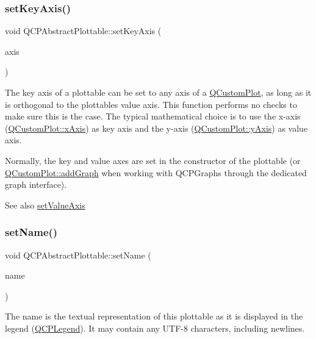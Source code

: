 \subsubsection{\texorpdfstring{set\+Key\+Axis()}{setKeyAxis()}}
{\footnotesize\ttfamily void Q\+C\+P\+Abstract\+Plottable\+::set\+Key\+Axis (\begin{DoxyParamCaption}\item[{\hyperlink{class_q_c_p_axis}{Q\+C\+P\+Axis} $\ast$}]{axis }\end{DoxyParamCaption})}

The key axis of a plottable can be set to any axis of a \hyperlink{class_q_custom_plot}{Q\+Custom\+Plot}, as long as it is orthogonal to the plottable\textquotesingle{}s value axis. This function performs no checks to make sure this is the case. The typical mathematical choice is to use the x-\/axis (\hyperlink{class_q_custom_plot_a9a79cd0158a4c7f30cbc702f0fd800e4}{Q\+Custom\+Plot\+::x\+Axis}) as key axis and the y-\/axis (\hyperlink{class_q_custom_plot_af6fea5679725b152c14facd920b19367}{Q\+Custom\+Plot\+::y\+Axis}) as value axis.

Normally, the key and value axes are set in the constructor of the plottable (or \hyperlink{class_q_custom_plot_a6fb2873d35a8a8089842d81a70a54167}{Q\+Custom\+Plot\+::add\+Graph} when working with Q\+C\+P\+Graphs through the dedicated graph interface).

\begin{DoxySeeAlso}{See also}
\hyperlink{class_q_c_p_abstract_plottable_a71626a07367e241ec62ad2c34baf21cb}{set\+Value\+Axis} 
\end{DoxySeeAlso}
\hypertarget{class_q_c_p_abstract_plottable_ab79c7ba76bc7fa89a4b3580e12149f1f}{}\label{class_q_c_p_abstract_plottable_ab79c7ba76bc7fa89a4b3580e12149f1f} 
\subsubsection{\texorpdfstring{set\+Name()}{setName()}}
{\footnotesize\ttfamily void Q\+C\+P\+Abstract\+Plottable\+::set\+Name (\begin{DoxyParamCaption}\item[{const Q\+String \&}]{name }\end{DoxyParamCaption})}

The name is the textual representation of this plottable as it is displayed in the legend (\hyperlink{class_q_c_p_legend}{Q\+C\+P\+Legend}). It may contain any U\+T\+F-\/8 characters, including newlines. \hypertarget{class_q_c_p_abstract_plottable_ab74b09ae4c0e7e13142fe4b5bf46cac7}{}\label{class_q_c_p_abstract_plottable_ab74b09ae4c0e7e13142fe4b5bf46cac7} 

